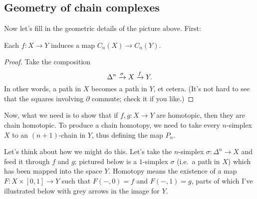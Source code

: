 \subsection*{Geometry of chain complexes}
Now let's fill in the geometric details of the picture above.
First:
\begin{lemma}
	Each $f : X \to Y$ induces a map $C_n(X) \to C_n(Y)$.
\end{lemma}
\begin{proof}
	Take the composition
	\[ \Delta^n \xrightarrow{\sigma} X \xrightarrow{f} Y. \]
	In other words, a path in $X$ becomes a path in $Y$, et cetera.
	(It's not hard to see that the squares involving $\partial$ commute;
	check it if you like.)
\end{proof}

Now, what we need is to show that if $f , g : X \to Y$ are homotopic,
then they are chain homotopic.
To produce a chain homotopy, we need to take every $n$-simplex $X$
to an $(n+1)$-chain in $Y$, thus defining the map $P_n$.

Let's think about how we might do this. Let's take the $n$-simplex $\sigma : \Delta^n \to X$
and feed it through $f$ and $g$; pictured below is a $1$-simplex $\sigma$ (i.e.\ a path in $X$)
which has been mapped into the space $Y$.
Homotopy means the existence of a map $F : X \times [0,1] \to Y$
such that $F(-,0) = f$ and $F(-,1) = g$, parts of which I've illustrated below with grey arrows
in the image for $Y$.

